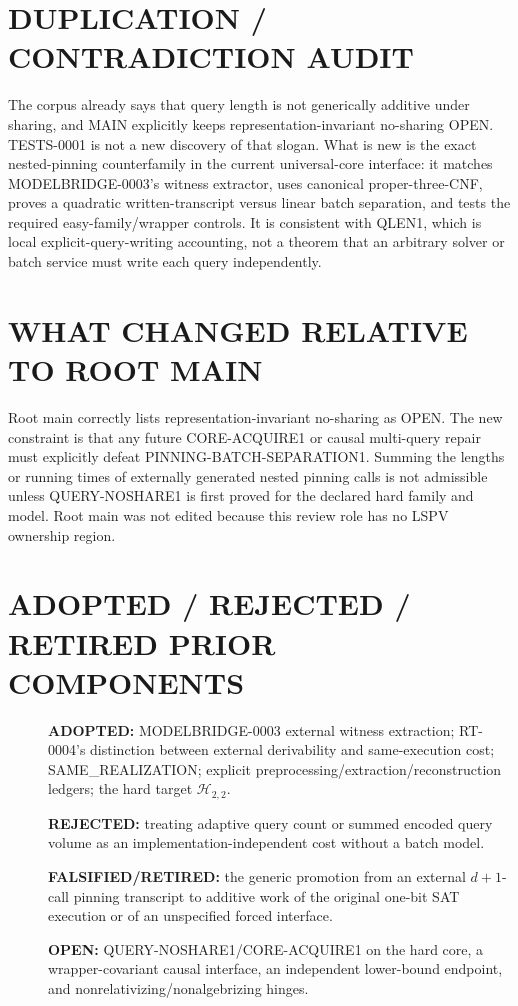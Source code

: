 \documentclass[11pt]{article}
\begin{document}
\section{DUPLICATION / CONTRADICTION AUDIT}
The corpus already says that query length is not generically additive under
sharing, and MAIN explicitly keeps representation-invariant no-sharing OPEN.
TESTS-0001 is not a new discovery of that slogan.  What is new is the exact
nested-pinning counterfamily in the current universal-core interface: it
matches MODELBRIDGE-0003's witness extractor, uses canonical proper-three-CNF,
proves a quadratic written-transcript versus linear batch separation, and
tests the required easy-family/wrapper controls.  It is consistent with
QLEN1, which is local explicit-query-writing accounting, not a theorem that
an arbitrary solver or batch service must write each query independently.

\section{WHAT CHANGED RELATIVE TO ROOT MAIN}
Root main correctly lists representation-invariant no-sharing as OPEN.  The
new constraint is that any future CORE-ACQUIRE1 or causal multi-query repair
must explicitly defeat PINNING-BATCH-SEPARATION1.  Summing the lengths or
running times of externally generated nested pinning calls is not admissible
unless QUERY-NOSHARE1 is first proved for the declared hard family and model.
Root main was not edited because this review role has no LSPV ownership region.

\section{ADOPTED / REJECTED / RETIRED PRIOR COMPONENTS}
\begin{description}
\item[] \textbf{ADOPTED:} MODELBRIDGE-0003 external witness extraction;
RT-0004's distinction between external derivability and same-execution cost;
SAME\_REALIZATION; explicit preprocessing/extraction/reconstruction ledgers;
the hard target $\mathcal H_{2,2}$.
\item[] \textbf{REJECTED:} treating adaptive query count or summed encoded
query volume as an implementation-independent cost without a batch model.
\item[] \textbf{FALSIFIED/RETIRED:} the generic promotion from an external
$d+1$-call pinning transcript to additive work of the original one-bit SAT
execution or of an unspecified forced interface.
\item[] \textbf{OPEN:} QUERY-NOSHARE1/CORE-ACQUIRE1 on the hard core, a
wrapper-covariant causal interface, an independent lower-bound endpoint, and
nonrelativizing/nonalgebrizing hinges.
\end{description}
\end{document}
